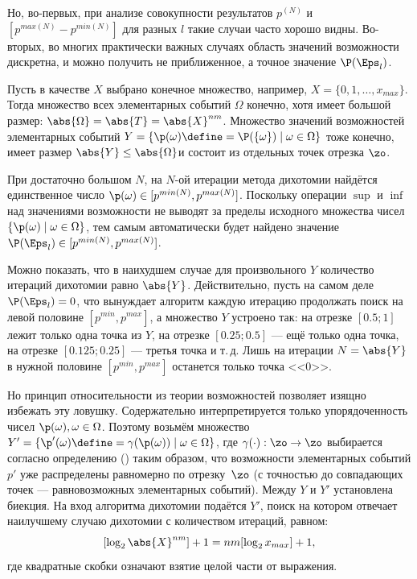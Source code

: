 Но, во-первых, при анализе совокупности результатов $p^{(N)}$ и $[p^{max(N)} - p^{min(N)}]$ для разных $l$ такие случаи часто хорошо видны. Во-вторых, во многих практически важных случаях область значений возможности дискретна, и можно получить не приближенное, а точное значение $\P(\Eps_l)$. 

Пусть в качестве $X$ выбрано конечное множество, например, $X = \{0, 1, \ldots, x_{max}\}$. Тогда множество всех элементарных событий $\Omega$ конечно, хотя имеет большой размер: $\abs{\Omega}= \abs{T} = \abs{X}^{nm}$. Множество значений возможностей элементарных событий $Y = \{\p(\omega) \define= \P(\{\omega\})\mid\omega\in\Omega\}$ тоже конечно, имеет размер $\abs{Y} \leq \abs{\Omega}$и состоит из отдельных точек отрезка $\zo$. 

При достаточно большом $N$, на $N$-ой итерации метода дихотомии найдётся единственное число $\p(\omega)\in[p^{min(N)}, p^{max(N)}]$. Поскольку операции $\sup$ и $\inf$ над значениями возможности не выводят за пределы исходного множества чисел $\{\p(\omega) \mid\omega\in\Omega\}$, тем самым автоматически будет найдено значение $\P(\Eps_l) \in [p^{min(N)}, p^{max(N)}]$.  

Можно показать, что в наихудшем случае для произвольного $Y$ количество итераций дихотомии равно $\abs{Y}$. 
Действительно, пусть на самом деле $\P(\Eps_l) = 0$, что вынуждает алгоритм каждую итерацию продолжать поиск на левой половине $[p^{min}, p^{max}]$, а множество $Y$ устроено так: на отрезке $[0.5;  1]$ лежит только одна точка из $Y$, на отрезке $[0.25;  0.5]$ --- ещё только одна точка, на отрезке $[0.125;  0.25]$ --- третья точка и т.\,д. Лишь на итерации $N = \abs{Y}$ в нужной половине $[p^{min}, p^{max}]$ останется только точка <<$0$>>. 

Но принцип относительности из теории возможностей позволяет изящно избежать эту ловушку. Содержательно интерпретируется только упорядоченность чисел $\p(\omega), \omega\in\Omega$. Поэтому возьмём множество $Y' = \{\p'(\omega) \define= \gamma(\p(\omega))\mid\omega\in\Omega\}$, где $\gamma(\cdot): \zo \to \zo$ выбирается согласно определению () таким образом, что возможности элементарных событий $p'$ уже распределены равномерно по отрезку~$\zo$ (с точностью до совпадающих точек --- равновозможных элементарных событий). Между $Y$ и $Y'$ установлена биекция. На вход алгоритма дихотомии подаётся $Y'$, поиск на котором отвечает наилучшему случаю дихотомии с количеством итераций, равном:
\begin{equation*}
  \label{e:}
  [ \log_{2}{\abs{X}^{nm}} ] + 1 = nm[ \log_{2}{x_{max}} ] + 1,
\end{equation*}
 где квадратные скобки означают взятие целой части от выражения.
 
